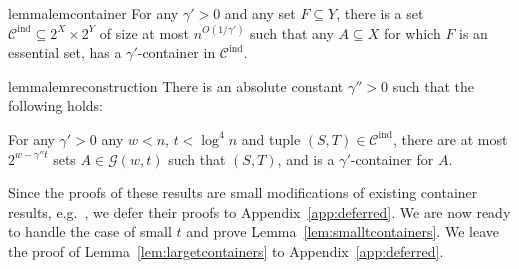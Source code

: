 \documentclass[11pt,letterpaper]{amsart}
\theoremstyle{definition}
\newcommand*{\Cind}{\mathcal{C}^{\mathrm{ind}}}
\begin{document}
\begin{restatable}{lemma}{lemcontainer}\label{lem:container}
For any $\gamma' > 0$ and any set $F \subseteq Y$, there is a set $\Cind \subseteq 2^X \times 2^Y$ of size at most $n^{O(1/\gamma')}$ such that any $A \subseteq X$ for which $F$ is an essential set, has a $\gamma'$-container in $\Cind$.
\end{restatable}

\begin{restatable}{lemma}{lemreconstruction}\label{lem:reconstruction}
There is an absolute constant $\gamma''>0$ such that the following holds:

For any $\gamma'>0$ any $w<n$, $t < \log^4 n$ and tuple $(S,T)\in \Cind$, there are at most $2^{w - \gamma'' t}$ sets $A \in \mathcal{G}(w,t)$ such that $(S,T)$, and is a $\gamma'$-container for $A$.
\end{restatable}

Since the proofs of these results are small modifications of existing container results, e.g.~\cite{PARK22}, we defer their proofs to Appendix~\ref{app:deferred}. 
We are now ready to handle the case of small $t$ and prove Lemma~\ref{lem:smalltcontainers}. We leave the proof of Lemma~\ref{lem:largetcontainers} to Appendix~\ref{app:deferred}.
\end{document}
